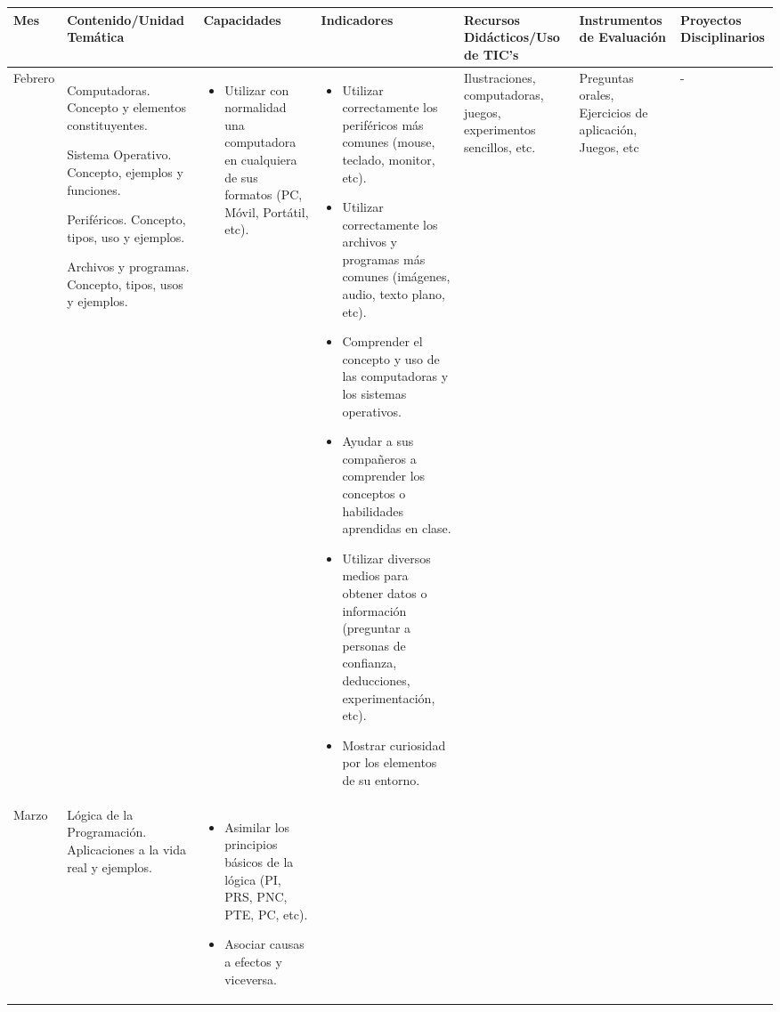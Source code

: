 \documentclass[landscape, a4paper, 10pt]{article}
\newcommand{\smallcellwidth}{0.7in}
\newcommand{\normalcellwidth}{1.2in}
\newcommand{\bigcellwidth}{2.0in}
\begin{document}
	\begin{longtable}{|m{\smallcellwidth}|p{\normalcellwidth}|p{\bigcellwidth}|p{\bigcellwidth}|p{\normalcellwidth}|p{\normalcellwidth}|p{\normalcellwidth}|}
		\hline
		\textbf{Mes} &
		\textbf{Contenido/Unidad Temática} &
		\textbf{Capacidades} &
		\textbf{Indicadores} &
		\textbf{Recursos Didácticos/Uso de TIC's} &
		\textbf{Instrumentos de Evaluación} &
		\textbf{Proyectos Disciplinarios} \\
		\hline
		\endhead
		Febrero &
		Computadoras. Concepto y elementos constituyentes.\par
		Sistema Operativo. Concepto, ejemplos y funciones.\par
		Periféricos. Concepto, tipos, uso y ejemplos.\par
		Archivos y programas. Concepto, tipos, usos y ejemplos. &
		\begin{itemize}
			\item Utilizar con normalidad una computadora en cualquiera de sus formatos (PC, Móvil, Portátil, etc).
		\end{itemize} &
		\begin{itemize}
			\item Utilizar correctamente los periféricos más comunes (mouse, teclado, monitor, etc).
			\item Utilizar correctamente los archivos y programas más comunes (imágenes, audio, texto plano, etc).
			\item Comprender el concepto y uso de las computadoras y los sistemas operativos.
			\item Ayudar a sus compañeros a comprender los conceptos o habilidades aprendidas en clase.
			\item Utilizar diversos medios para obtener datos o información (preguntar a personas de confianza, deducciones, experimentación, etc).
			\item Mostrar curiosidad por los elementos de su entorno.
		\end{itemize} &
		Ilustraciones, computadoras, juegos, experimentos sencillos, etc. &
		Preguntas orales, Ejercicios de aplicación, Juegos, etc &
		 - \\
		\hline
		Marzo &
		Lógica de la Programación. Aplicaciones a la vida real y ejemplos. &
		\begin{itemize}
			\item Asimilar los principios básicos de la lógica (PI, PRS, PNC, PTE, PC, etc).
			\item Asociar causas a efectos y viceversa.

\end{itemize}
\end{longtable}
\end{document}
